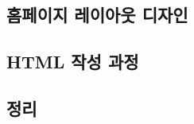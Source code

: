 \documentclass[runningheads]{llncs}
\begin{document}
\subsection{홈페이지 레이아웃 디자인}

\subsection{HTML 작성 과정}

\subsection{정리}
  
\end{document}
